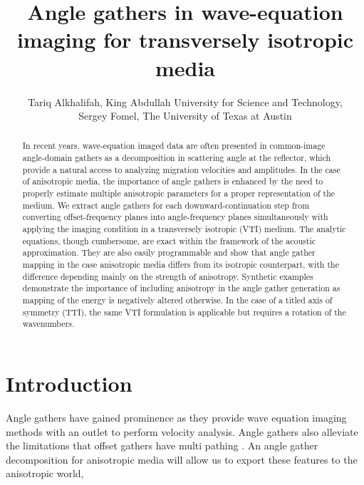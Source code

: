 



\title{Angle gathers in wave-equation imaging for transversely isotropic media}

\author{Tariq Alkhalifah, King Abdullah University for Science and Technology, \\
       Sergey Fomel, The University of Texas at Austin}
\maketitle

\begin{abstract}
  In recent years, wave-equation imaged data are often presented in common-image angle-domain gathers as a decomposition in scattering
  angle at the reflector, which provide a natural access to analyzing
  migration velocities and amplitudes. In the case of anisotropic
  media, the importance of angle gathers is enhanced by the need to
  properly estimate multiple anisotropic parameters for a proper
  representation of the medium.  We extract angle gathers for each
  downward-continuation step from converting offset-frequency
  planes into angle-frequency planes simultaneously with applying the
  imaging condition in a transversely isotropic  (VTI) medium. The
  analytic equations, though cumbersome, are exact within the
  framework of the acoustic approximation.  They are also easily
  programmable and show that angle gather mapping in the case 
  anisotropic media differs from its isotropic counterpart, with the difference
  depending mainly on the strength of anisotropy. Synthetic examples demonstrate
  the importance of including anisotropy in the angle gather generation as mapping of
  the energy is negatively altered otherwise. In the case of a titled axis of symmetry (TTI), 
the same VTI formulation is applicable but requires a rotation
  of the wavenumbers.

\end{abstract}

\section{Introduction}

Angle gathers have gained prominence as they provide  wave equation imaging methods with an outlet
to perform velocity analysis. Angle gathers also alleviate the limitations that offset gathers have
  multi pathing \cite[]{GEO55-09-12231234,SEG-2000-08300833,stolk}. An angle gather decomposition for 
anisotropic media will allow us to export these features to the anisotropic world, 

